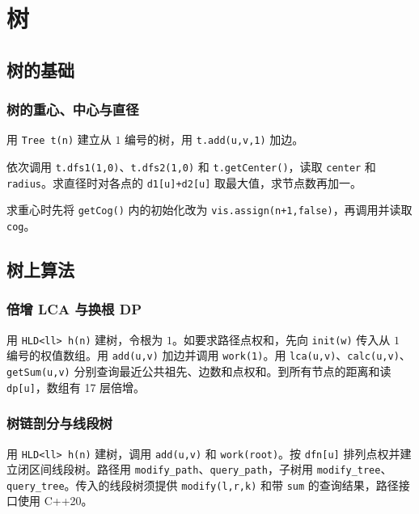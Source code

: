 \chapter{树}

\section{树的基础}

\subsection{树的重心、中心与直径}

用 \texttt{Tree t(n)} 建立从 $1$ 编号的树，用 \texttt{t.add(u,v,1)} 加边。

依次调用 \texttt{t.dfs1(1,0)}、\texttt{t.dfs2(1,0)} 和 \texttt{t.getCenter()}，读取 \texttt{center} 和 \texttt{radius}。求直径时对各点的 \texttt{d1[u]+d2[u]} 取最大值，求节点数再加一。

求重心时先将 \texttt{getCog()} 内的初始化改为 \texttt{vis.assign(n+1,false)}，再调用并读取 \texttt{cog}。


\section{树上算法}

\subsection{倍增 LCA 与换根 DP}

用 \texttt{HLD<ll> h(n)} 建树，令根为 $1$。如要求路径点权和，先向 \texttt{init(w)} 传入从 $1$ 编号的权值数组。用 \texttt{add(u,v)} 加边并调用 \texttt{work(1)}。用 \texttt{lca(u,v)}、\texttt{calc(u,v)}、\texttt{getSum(u,v)} 分别查询最近公共祖先、边数和点权和。到所有节点的距离和读 \texttt{dp[u]}，数组有 17 层倍增。


\subsection{树链剖分与线段树}

用 \texttt{HLD<ll> h(n)} 建树，调用 \texttt{add(u,v)} 和 \texttt{work(root)}。按 \texttt{dfn[u]} 排列点权并建立闭区间线段树。路径用 \texttt{modify\_path}、\texttt{query\_path}，子树用 \texttt{modify\_tree}、\texttt{query\_tree}。传入的线段树须提供 \texttt{modify(l,r,k)} 和带 \texttt{sum} 的查询结果，路径接口使用 C++20。

